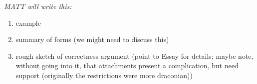 {\it \color{red} MATT will write this:

\begin{enumerate}

\item example
\item summary of forms (we might need to discuss this)
\item rough sketch of correctness argument (point to Essay for
  details; maybe note, without going into it, that attachments present
  a complication, but need support (originally the restrictions were
  more draconian))

\end{enumerate}
}


